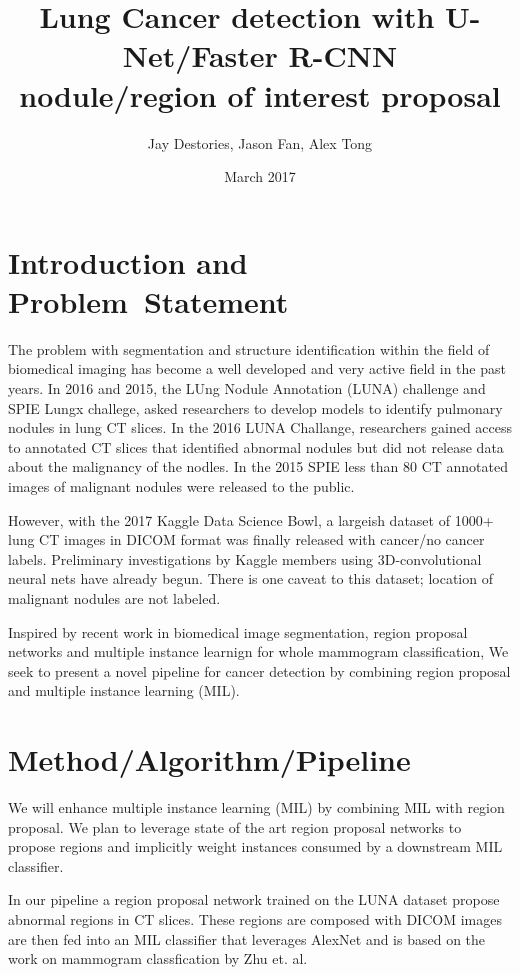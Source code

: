 \documentclass[twocolumn,10pt]{article}
\title{Lung Cancer detection with U-Net/Faster R-CNN \\
nodule/region of interest proposal}
\author{Jay Destories, Jason Fan, Alex Tong}
\date{March 2017}
\newcommand{\red}[1]{{\color{red}#1}}
\newcommand{\temp}[1]{{\red{#1}\\}}
\begin{document}
\maketitle
\section{Introduction and \\Problem~Statement}
The problem with segmentation and structure identification within the field of 
biomedical imaging has become a well developed and very active field in the past
years. In 2016 and 2015, the LUng Nodule Annotation (LUNA) challenge and 
SPIE Lungx challege, asked researchers to develop models to identify pulmonary 
nodules in lung CT slices. In the 2016 LUNA Challange, researchers gained access
to annotated CT slices that identified abnormal nodules but did not release data
about the malignancy of the nodles. In the 2015 SPIE less than 80 CT annotated 
images of malignant nodules were released to the public.

However, with the 2017 Kaggle Data Science Bowl, a large\red{ish} dataset of
1000+ lung CT images in DICOM format was finally released with cancer/no cancer 
labels. Preliminary investigations by Kaggle members
using 3D-convolutional neural nets have already begun. There is one caveat to this 
dataset; location of malignant nodules are not labeled. 

Inspired by recent work in biomedical image segmentation, region proposal 
networks and multiple instance learnign for whole mammogram classification,
We seek to present a novel pipeline for cancer detection by combining
region proposal and multiple instance learning (MIL).

\section{Method/Algorithm/Pipeline}


We will enhance multiple instance learning (MIL) by combining
MIL with region proposal. We plan to leverage state of the 
art region proposal networks to propose regions and implicitly weight instances 
consumed by a downstream MIL classifier.

In our pipeline a region proposal network trained on the LUNA dataset propose
abnormal regions in CT slices. These regions are composed with 
DICOM images are then fed into an MIL classifier that leverages AlexNet and 
is based on the work on mammogram classfication by Zhu et. al.
\end{document}
